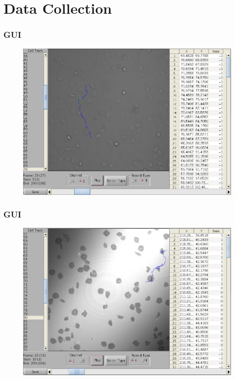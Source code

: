 \documentclass[8pt]{beamer}
\begin{document}
\section{Data Collection}  
\begin{frame}
  \frametitle{GUI}  
  
    \begin{figure}[H]\centering
    \includegraphics[width=.9\textwidth]{../fig/sc1.png}
  \end{figure}
  
\end{frame}

\begin{frame}
  \frametitle{GUI}  
  
    \begin{figure}[H]\centering
    \includegraphics[width=.9\textwidth]{../fig/sc2.png}
  \end{figure}
  
\end{frame}
\end{document}
